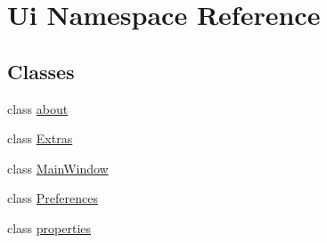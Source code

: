 \hypertarget{namespaceUi}{
\section{Ui Namespace Reference}
\label{namespaceUi}
}
\subsection*{Classes}
\begin{DoxyCompactItemize}
\item 
class \hyperlink{classUi_1_1about}{about}
\item 
class \hyperlink{classUi_1_1Extras}{Extras}
\item 
class \hyperlink{classUi_1_1MainWindow}{MainWindow}
\item 
class \hyperlink{classUi_1_1Preferences}{Preferences}
\item 
class \hyperlink{classUi_1_1properties}{properties}
\end{DoxyCompactItemize}
